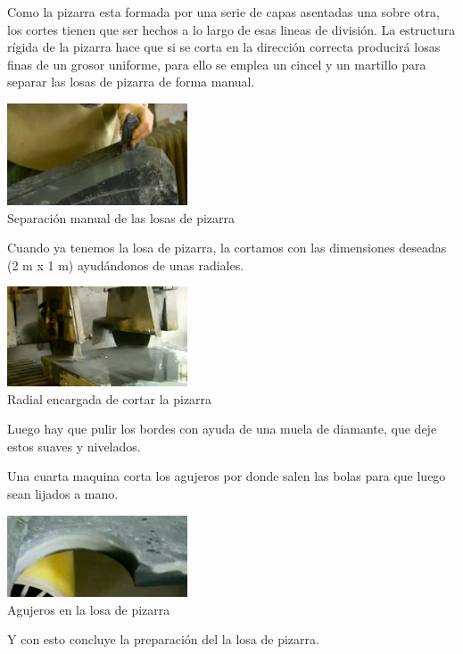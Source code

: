 Como la pizarra esta formada por una serie de capas asentadas una sobre otra, los cortes tienen que ser hechos  a lo largo de esas lineas de división.
  La estructura rígida  de la pizarra hace que si se corta en la dirección correcta producirá losas finas de un grosor uniforme, para ello se emplea un cincel y un martillo para separar las losas de pizarra de forma manual.
	\begin{center}
	    		\includegraphics[width=0.4\textwidth]{Pantallazo-5.png}
			\\ \small {Separación manual de las losas de pizarra}
	\end{center}

Cuando ya tenemos la losa de pizarra, la cortamos con las dimensiones deseadas (2 m x 1 m) ayudándonos de unas radiales. 
\begin{center}
	    		\includegraphics[width=0.4\textwidth]{Pantallazo-6.png}
		        \\ \small {Radial encargada de cortar la pizarra}

	\end{center}

Luego hay que  pulir los bordes con ayuda de una muela de diamante, que deje estos suaves y nivelados.


Una cuarta maquina corta los agujeros por donde salen las bolas para que luego sean lijados a mano.

\begin{center}
	    		\includegraphics[width=0.4\textwidth]{Pantallazo-7.png}
      \\ \small {Agujeros en la losa de pizarra}


	\end{center}
 Y con esto concluye la preparación del la losa de pizarra.

